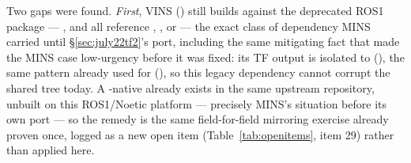 Two gaps were found. \emph{First}, VINS () still builds
against the deprecated ROS1  package —
,  and  all reference
, ,
 or  — the exact class of dependency
MINS carried until \S\ref{sec:july22tf2}'s port, including the same
mitigating fact that made the MINS case low-urgency before it was fixed:
its TF output is isolated to 
(), the same pattern already used
for  (), so this legacy dependency
cannot corrupt the shared tree today. A -native
 already exists in the same upstream repository,
unbuilt on this ROS1/Noetic platform — precisely MINS's situation before
its own port — so the remedy is the same field-for-field mirroring
exercise already proven once, logged as a new open item
(Table~\ref{tab:openitems}, item 29) rather than applied here.

